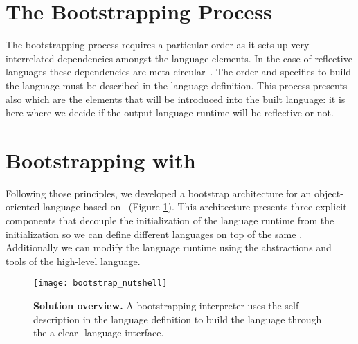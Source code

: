 \section{The Bootstrapping Process}\label{sec:bootstrapping_process}
The bootstrapping process requires a particular order as it sets up very interrelated dependencies amongst the language elements. In the case of reflective languages these dependencies are meta-circular~\cite{Stra14a,Chib96a,Maes87a,Smit84a}. The order and specifics to build the language must be described in the language definition. This process presents also which are the elements that will be introduced into the built language: it is here where we decide if the output language runtime will be reflective or not.


\section{Bootstrapping with \Vtt}\label{sec:bootstrapping_infrastructure}

Following those principles, we developed a bootstrap architecture for an object-oriented language based on \Vtt~(Figure \ref{fig:bootstrapping_overview}). This architecture presents three explicit components that decouple the initialization of the language runtime from the \VM initialization so we can define different languages on top of the same \VM. Additionally we can modify the language runtime using the abstractions and tools of the high-level language.

\begin{figure}[ht]
\center
\texttt{[image: bootstrap\_nutshell]}
\caption{\textbf{Solution overview.} A bootstrapping interpreter uses the self-description in the language definition to build the language through the a clear \VM-language interface.\label{fig:bootstrapping_overview}}
\end{figure}


